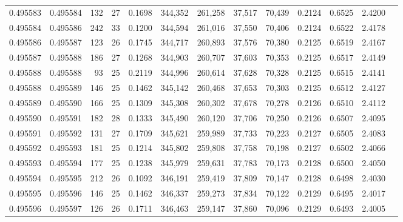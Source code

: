 \begin{tabular}{rrrrrrrrrrrrr}
0.495583 & 0.495584 & 132 &  27 &                                     0.1698 & 344,352 & 261,258 &  37,517 &  70,439 & 0.2124 & 0.6525 & 2.4200 \\
0.495584 & 0.495586 & 242 &  33 &                                     0.1200 & 344,594 & 261,016 &  37,550 &  70,406 & 0.2124 & 0.6522 & 2.4178 \\
0.495586 & 0.495587 & 123 &  26 &                                     0.1745 & 344,717 & 260,893 &  37,576 &  70,380 & 0.2125 & 0.6519 & 2.4167 \\
0.495587 & 0.495588 & 186 &  27 &                                     0.1268 & 344,903 & 260,707 &  37,603 &  70,353 & 0.2125 & 0.6517 & 2.4149 \\
0.495588 & 0.495588 &  93 &  25 &                                     0.2119 & 344,996 & 260,614 &  37,628 &  70,328 & 0.2125 & 0.6515 & 2.4141 \\
0.495588 & 0.495589 & 146 &  25 &                                     0.1462 & 345,142 & 260,468 &  37,653 &  70,303 & 0.2125 & 0.6512 & 2.4127 \\
0.495589 & 0.495590 & 166 &  25 &                                     0.1309 & 345,308 & 260,302 &  37,678 &  70,278 & 0.2126 & 0.6510 & 2.4112 \\
0.495590 & 0.495591 & 182 &  28 &                                     0.1333 & 345,490 & 260,120 &  37,706 &  70,250 & 0.2126 & 0.6507 & 2.4095 \\
0.495591 & 0.495592 & 131 &  27 &                                     0.1709 & 345,621 & 259,989 &  37,733 &  70,223 & 0.2127 & 0.6505 & 2.4083 \\
0.495592 & 0.495593 & 181 &  25 &                                     0.1214 & 345,802 & 259,808 &  37,758 &  70,198 & 0.2127 & 0.6502 & 2.4066 \\
0.495593 & 0.495594 & 177 &  25 &                                     0.1238 & 345,979 & 259,631 &  37,783 &  70,173 & 0.2128 & 0.6500 & 2.4050 \\
0.495594 & 0.495595 & 212 &  26 &                                     0.1092 & 346,191 & 259,419 &  37,809 &  70,147 & 0.2128 & 0.6498 & 2.4030 \\
0.495595 & 0.495596 & 146 &  25 &                                     0.1462 & 346,337 & 259,273 &  37,834 &  70,122 & 0.2129 & 0.6495 & 2.4017 \\
0.495596 & 0.495597 & 126 &  26 &                                     0.1711 & 346,463 & 259,147 &  37,860 &  70,096 & 0.2129 & 0.6493 & 2.4005 \\

\end{tabular}
